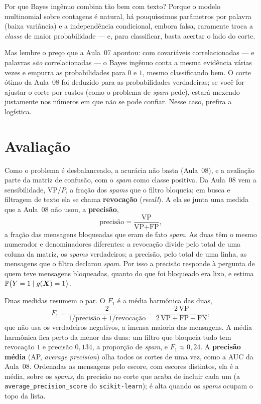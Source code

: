 \documentclass[11pt,a4paper]{article}
\begin{document}
\begin{ideia}
Por que Bayes ingênuo combina tão bem com texto? Porque o modelo multinomial sobre
contagens é natural, há pouquíssimos parâmetros por palavra (baixa variância) e a
independência condicional, embora falsa, raramente troca a \emph{classe} de maior
probabilidade --- e, para classificar, basta acertar o lado do corte.
\end{ideia}

\begin{atencao}
Mas lembre o preço que a Aula~07 apontou: com covariáveis correlacionadas --- e
palavras \emph{são} correlacionadas --- o Bayes ingênuo conta a mesma evidência várias
vezes e empurra as probabilidades para $0$ e $1$, mesmo classificando bem. O corte
ótimo da Aula~08 foi deduzido para as probabilidades verdadeiras; se você for ajustar
o corte por custos (como o problema de \emph{spam} pede), estará mexendo justamente
nos números em que não se pode confiar. Nesse caso, prefira a logística.
\end{atencao}

\section{Avaliação}\label{sec:avaliacao}
Como o problema é desbalanceado, a acurácia não basta (Aula~08), e a avaliação parte
da matriz de confusão, com o \emph{spam} como classe positiva. Da Aula~08 vem a
sensibilidade, $\text{VP}/P$, a fração dos \emph{spams} que o filtro bloqueia; em
busca e filtragem de texto ela se chama \textbf{revocação} (\emph{recall}). A ela se
junta uma medida que a Aula~08 não usou, a \textbf{precisão},
\[
  \text{precisão}=\frac{\text{VP}}{\text{VP}+\text{FP}},
\]
a fração das mensagens bloqueadas que eram de fato \emph{spam}. As duas têm o mesmo
numerador e denominadores diferentes: a revocação divide pelo total de uma coluna da
matriz, os \emph{spams} verdadeiros; a precisão, pelo total de uma linha, as
mensagens que o filtro declarou \emph{spam}. Por isso a precisão responde à pergunta
de quem teve mensagens bloqueadas, quanto do que foi bloqueado era lixo, e estima
$\mathbb{P}\big(Y=1\mid g(\bm{X})=1\big)$.

Duas medidas resumem o par. O \textbf{$F_1$} é a média harmônica das duas,
\[
  F_1=\frac{2}{1/\text{precisão}+1/\text{revocação}}
     =\frac{2\,\text{VP}}{2\,\text{VP}+\text{FP}+\text{FN}} ,
\]
que não usa os verdadeiros negativos, a imensa maioria das mensagens. A média
harmônica fica perto da menor das duas: um filtro que bloqueia tudo tem revocação $1$
e precisão $0{,}134$, a proporção de \emph{spam}, e $F_1\approx0{,}24$. A
\textbf{precisão média} (AP, \emph{average precision}) olha todos os cortes de uma
vez, como a AUC da Aula~08. Ordenadas as mensagens pelo escore, com escores
distintos, ela é a média, sobre os \emph{spams}, da precisão no corte que acaba de
incluir cada um (a \texttt{average\_precision\_score} do \texttt{scikit-learn}); é
alta quando os \emph{spams} ocupam o topo da lista.
\end{document}
